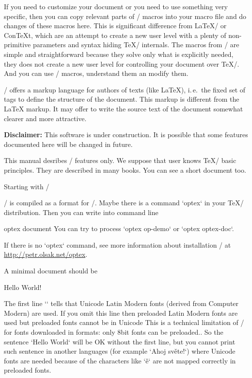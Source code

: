 If you need to customize your document or you need to use something
very specific, then you can copy relevant parts of \OpTeX/ macros into your macro
file and do changes of these macros here. This is significant difference from
\LaTeX/ or ConTeXt, which are an attempt to create a new user level with a
plenty of non-primitive parameters and syntax hiding \TeX/ internals.
The macros from \OpTeX/ are simple and straightforward because they solve only
what is explicitly needed, they does not create a new user level for
controlling your document over \TeX/.
And you can use \OpTeX/ macros, understand them an modify them.

\OpTeX/ offers a markup language for authors of texts (like \LaTeX),
i.\,e.\ the fixed set of tags to define the structure of the document. This
markup is different from the \LaTeX{} markup. It may offer to write the
source text of the document somewhat clearer and more attractive. 

\new 
{\bf Disclaimer:} This software is under construction. It is possible
that some features documented here will be changed in future. 

This manual desribes \OpTeX/ features only. We suppose that user knows \TeX/
basic principles. They are described in many books. You can see a short
document  too.


\sec Starting with \OpTeX/

\new
\OpTeX/ is compiled as a format for \LuaTeX/. Maybe there is a command
`optex` in your \TeX/ distribution. Then you can write into command line

\begtt
optex document
\endtt
%
You can try to process `optex op-demo` or `optex optex-doc`.

If there is no `optex` command, see more information about installation
\OpTeX/ at \url{http://petr.olsak.net/optex}. 

A minimal document should be

\begtt
\fontfam[LMfonts]
Hello World! \bye
\endtt

The first line `\fontfam[LMfonts]` tells that Unicode Latin Modern 
fonts (derived from Computer Modern) are used. If you omit this line then
preloaded Latin Modern fonts are used but preloaded fonts cannot be in
Unicode\fnote
{This is a technical limitation of \LuaTeX/ for fonts downloaded in formats:
only 8bit fonts can be preloaded.}.
So the sentence `Hello World` will be OK without the first line, but you 
cannot print such sentence in another languages (for example `Ahoj světe!`) 
where Unicode fonts are needed
because of the characters like `ě` are not mapped correctly in preloaded
fonts.

